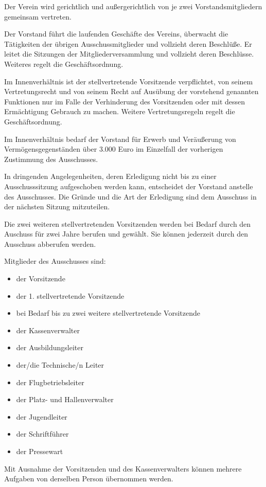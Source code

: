\documentclass[10pt,a4paper,parskip=half]{scrartcl}
\begin{document}
\begin{contract}
    Der Verein wird gerichtlich und außergerichtlich von je zwei Vorstandsmitgliedern gemeinsam vertreten.
    
    Der Vorstand führt die laufenden Geschäfte des Vereins, überwacht die Tätigkeiten der übrigen Ausschussmitglieder und vollzieht deren Beschlüße. 
    Er leitet die Sitzungen der Mitgliederversammlung und vollzieht deren Beschlüsse.
    Weiteres regelt die Geschäftsordnung.
    
    Im Innenverhältnis ist der stellvertretende Vorsitzende verpflichtet,
    von seinem Vertretungsrecht und von seinem Recht auf Ausübung der vorstehend genannten Funktionen nur im Falle der Verhinderung des Vorsitzenden oder mit dessen Ermächtigung Gebrauch zu machen. Weitere Vertretungsregeln regelt die Geschäftsordnung.
    
    Im Innenverhältnis bedarf der Vorstand für Erwerb und Veräußerung von Vermögensgegenständen über 3.000 Euro im Einzelfall der vorherigen Zustimmung des Ausschusses.
    
    In dringenden Angelegenheiten,
    deren Erledigung nicht bis zu einer Ausschusssitzung aufgeschoben werden kann,
    entscheidet der Vorstand anstelle des Ausschusses.
    Die Gründe und die Art der Erledigung sind dem Ausschuss in der nächsten Sitzung mitzuteilen.

    Die zwei weiteren stellvertretenden Vorsitzenden werden bei Bedarf durch den Auschuss für zwei Jahre berufen und gewählt.
    Sie können jederzeit durch den Ausschuss abberufen werden.
    
    \label{C:Ausschuss}
    Mitglieder des Ausschusses sind:
    \begin{itemize}[noitemsep]
      \item der Vorsitzende
      \item der 1. stellvertretende Vorsitzende
      \item bei Bedarf bis zu zwei weitere stellvertretende Vorsitzende
      \item der Kassenverwalter
      \item der Ausbildungsleiter
      \item der/die Technische/n Leiter
      \item der Flugbetriebsleiter
      \item der Platz- und Hallenverwalter
      \item der Jugendleiter
      \item der Schriftführer
      \item der Pressewart
    \end{itemize}
    Mit Ausnahme der Vorsitzenden und des Kassenverwalters können mehrere Aufgaben von derselben Person übernommen werden.
    

\end{contract}
\end{document}
